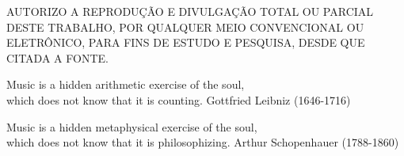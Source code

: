 \capa


\folhaderosto
% 
\pretextualchapter{}
	\thispagestyle{plain}
	\noindent \parbox{5.7in}{\centering AUTORIZO A REPRODUÇÃO E DIVULGAÇÃO TOTAL OU PARCIAL DESTE TRABALHO, POR QUALQUER MEIO CONVENCIONAL OU ELETRÔNICO, PARA FINS DE ESTUDO E PESQUISA, DESDE QUE CITADA A FONTE.}

\pretextualchapter{}



%

\afterpage{\blankpage}




\pretextualchapter{}
	\begin{epigrafetop}
		{Music is a hidden arithmetic exercise of the soul, \\ which does not know that it is counting.}
        {Gottfried Leibniz (1646-1716)}
	\end{epigrafetop}



	\begin{epigrafemid}
		{Music is a hidden metaphysical exercise of the soul, \\ which does not know that it is philosophizing.} %
		{Arthur Schopenhauer (1788-1860)} %
	\end{epigrafemid}
	\vspace{-1cm}

